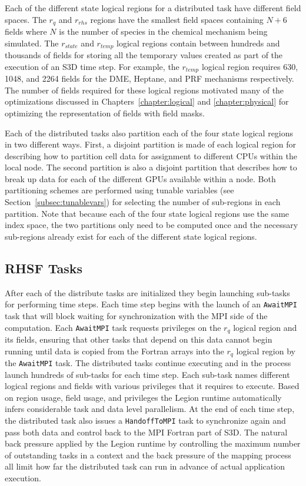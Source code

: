 Each of the different state logical regions for a
distributed task have different field spaces. The
$r_q$ and $r_{rhs}$ regions have the smallest field
spaces containing $N+6$ fields where $N$ is the 
number of species in the chemical mechanism being
simulated. The $r_{state}$ and $r_{temp}$ logical
regions contain between hundreds and thousands of
fields for storing all the temporary values created
as part of the execution of an S3D time step. For
example, the $r_{temp}$ logical region requires 
630, 1048, and 2264 fields for the DME, Heptane,
and PRF mechanisms respectively. The number of
fields required for these logical regions motivated
many of the optimizations discussed in 
Chapters~\ref{chapter:logical} and 
\ref{chapter:physical} for optimizing the representation
of fields with field masks.

Each of the distributed tasks also partition each of
the four state logical regions in two different ways.
First, a disjoint partition is made of each logical
region for describing how to partition cell data for
assignment to different CPUs within the local node.
The second partition is also a disjoint partition that
describes how to break up data for each of the 
different GPUs available within a node. Both partitioning
schemes are performed using tunable variables 
(see Section~\ref{subsec:tunablevars}) for selecting
the number of sub-regions in each partition. Note
that because each of the four state logical regions
use the same index space, the two partitions only need
to be computed once and the necessary sub-regions already
exist for each of the different state logical regions.

\subsection{RHSF Tasks}
\label{subsec:rhsftasks}
After each of the distribute tasks are initialized they
begin launching sub-tasks for performing time steps.
Each time step begins with the launch of an {\tt AwaitMPI}
task that will block waiting for synchronization with
the MPI side of the computation. Each {\tt AwaitMPI} task
requests privileges on the $r_q$ logical region and its
fields, ensuring that other tasks that depend on this
data cannot begin running until data is copied from the 
Fortran arrays into the $r_q$ logical region by the 
{\tt AwaitMPI} task. The distributed tasks continue
executing and in the process launch hundreds of sub-tasks for 
each time step. Each sub-task names different logical regions
and fields with various privileges that it requires to
execute. Based on region usage, field usage, and privileges
the Legion runtime automatically infers considerable task
and data level parallelism. At the end of each time step,
the distributed task also issues a {\tt HandoffToMPI} task
to synchronize again and pass both data and control back
to the MPI Fortran part of S3D. The natural back pressure 
applied by the Legion runtime by controlling the maximum 
number of outstanding tasks in a context and the back 
pressure of the mapping process all limit how far the 
distributed task can run in advance of actual 
application execution.

